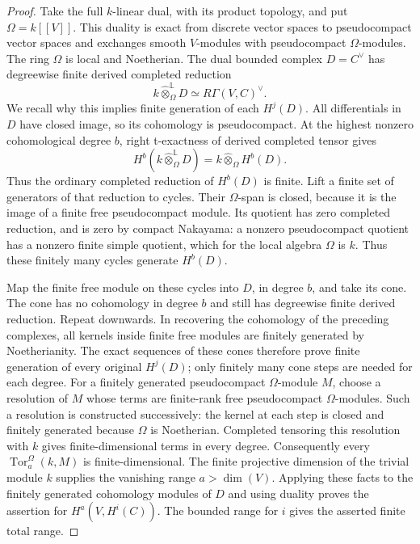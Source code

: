 \begin{proof}
Take the full $k$-linear dual, with its product topology, and put
$\Omega=k[[V]]$.  This duality is exact from discrete vector spaces
to pseudocompact vector spaces and exchanges smooth $V$-modules
with pseudocompact $\Omega$-modules.  The ring $\Omega$ is local and
Noetherian.  The dual bounded complex $D=C^\vee$ has
degreewise finite derived completed reduction
\[
 k\mathbin{\widehat\otimes}^{\mathbb L}_{\Omega}D
       \simeq R\Gamma(V,C)^\vee.
\]
We recall why this implies finite generation of each $H^j(D)$.
All differentials in $D$ have closed image, so its cohomology is
pseudocompact. At the highest nonzero cohomological degree $b$,
right t-exactness of derived completed tensor gives
\[
 H^b\!\left(k\mathbin{\widehat\otimes}^{\mathbb L}_\Omega D\right)
     =k\mathbin{\widehat\otimes}_\Omega H^b(D).
\]
Thus the ordinary completed reduction of $H^b(D)$ is finite.
Lift a finite set of
generators of that reduction to cycles.  Their $\Omega$-span is
closed, because it is the image of a finite free pseudocompact
module.  Its quotient has zero completed reduction, and is zero
by compact Nakayama: a nonzero pseudocompact quotient has a
nonzero finite simple quotient, which for the local algebra
$\Omega$ is $k$.  Thus these finitely many cycles generate
$H^b(D)$.

Map the finite free module on these cycles into $D$, in degree
$b$, and take its cone.  The cone has no cohomology in degree
$b$ and still has degreewise finite derived reduction.  Repeat
downwards.  In recovering the cohomology of the preceding
complexes, all kernels inside finite free modules are finitely
generated by Noetherianity.  The exact sequences of these cones
therefore prove finite generation of every original $H^j(D)$;
only finitely many cone steps are needed for each degree.
For a finitely generated pseudocompact $\Omega$-module $M$, choose
a resolution of $M$ whose terms are finite-rank free
pseudocompact $\Omega$-modules.  Such a resolution is constructed
successively: the kernel at each step is closed and finitely
generated because $\Omega$ is Noetherian.  Completed tensoring
this resolution with $k$ gives finite-dimensional terms in every
degree.  Consequently every
$\operatorname{Tor}^{\Omega}_a(k,M)$ is finite-dimensional.
The finite projective dimension of the trivial module $k$
supplies the vanishing range $a>\dim(V)$.  Applying these facts
to the finitely generated cohomology modules of $D$ and using
duality proves the assertion for $H^a(V,H^i(C))$.  The bounded
range for $i$ gives the asserted finite total range.
\end{proof}

